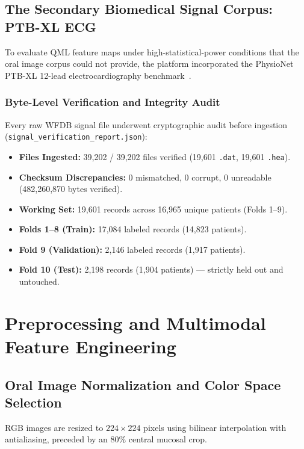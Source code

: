 \documentclass[11pt,a4paper]{report}
\newcommand{\artifact}[1]{\nolinkurl{#1}}
\begin{document}
\section{The Secondary Biomedical Signal Corpus: PTB-XL ECG}
To evaluate QML feature maps under high-statistical-power conditions that the oral image corpus could not provide, the platform incorporated the PhysioNet PTB-XL 12-lead electrocardiography benchmark~\cite{wagner2020ptbxl}.

\subsection{Byte-Level Verification and Integrity Audit}
Every raw WFDB signal file underwent cryptographic audit before ingestion (\artifact{signal\_verification\_report.json}):
\begin{itemize}
  \item \textbf{Files Ingested:} 39,202 / 39,202 files verified (19,601 \texttt{.dat}, 19,601 \texttt{.hea}).
  \item \textbf{Checksum Discrepancies:} 0 mismatched, 0 corrupt, 0 unreadable (482,260,870 bytes verified).
  \item \textbf{Working Set:} 19,601 records across 16,965 unique patients (Folds 1--9).
  \item \textbf{Folds 1--8 (Train):} 17,084 labeled records (14,823 patients).
  \item \textbf{Fold 9 (Validation):} 2,146 labeled records (1,917 patients).
  \item \textbf{Fold 10 (Test):} 2,198 records (1,904 patients) --- strictly held out and untouched.
\end{itemize}

\chapter{Preprocessing and Multimodal Feature Engineering}

\section{Oral Image Normalization and Color Space Selection}
RGB images are resized to $224 \times 224$ pixels using bilinear interpolation with antialiasing, preceded by an 80\% central mucosal crop. 
\end{document}
